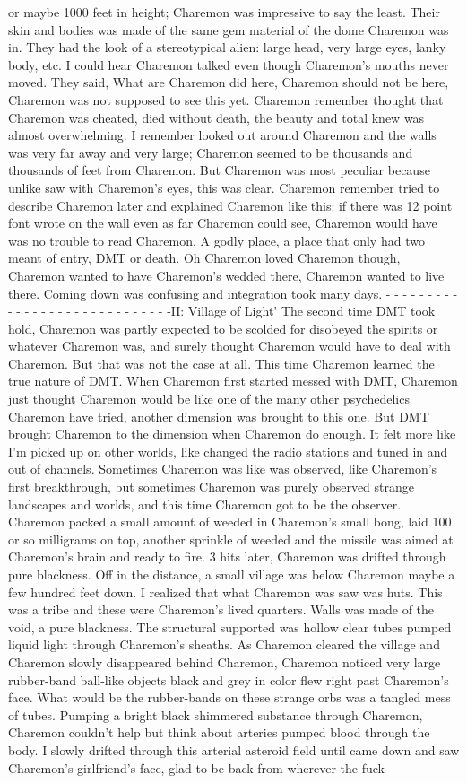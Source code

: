 \documentclass[12pt]{book}
\begin{document}
or maybe 1000 feet in height; Charemon was impressive to say the least. Their skin and bodies was made of the same gem material of the dome Charemon was in. They had the look of a stereotypical alien: large head, very large eyes, lanky body, etc. I could hear Charemon talked even though Charemon's mouths never moved. They said, What are Charemon did here, Charemon should not be here, Charemon was not supposed to see this yet.  Charemon remember thought that Charemon was cheated, died without death, the beauty and total knew was almost overwhelming. I remember looked out around Charemon and the walls was very far away and very large; Charemon seemed to be thousands and thousands of feet from Charemon. But Charemon was most peculiar because unlike saw with Charemon's eyes, this was clear. Charemon remember tried to describe Charemon later and explained Charemon like this: if there was 12 point font wrote on the wall even as far Charemon could see, Charemon would have was no trouble to read Charemon. A godly place, a place that only had two meant of entry, DMT or death. Oh Charemon loved Charemon though, Charemon wanted to have Charemon's wedded there, Charemon wanted to live there. Coming down was confusing and integration took many days. - - - - - - - - - - - - - - - - - - - - - - - - - - - - -II: Village of Light' The second time DMT took hold, Charemon was partly expected to be scolded for disobeyed the spirits or whatever Charemon was, and surely thought Charemon would have to deal with Charemon. But that was not the case at all. This time Charemon learned the true nature of DMT. When Charemon first started messed with DMT, Charemon just thought Charemon would be like one of the many other psychedelics Charemon have tried, another dimension was brought to this one. But DMT brought Charemon to the dimension when Charemon do enough. It felt more like I'm picked up on other worlds, like changed the radio stations and tuned in and out of channels. Sometimes Charemon was like was observed, like Charemon's first breakthrough, but sometimes Charemon was purely observed strange landscapes and worlds, and this time Charemon got to be the observer. Charemon packed a small amount of weeded in Charemon's small bong, laid 100 or so milligrams on top, another sprinkle of weeded and the missile was aimed at Charemon's brain and ready to fire. 3 hits later, Charemon was drifted through pure blackness. Off in the distance, a small village was below Charemon maybe a few hundred feet down. I realized that what Charemon was saw was huts. This was a tribe and these were Charemon's lived quarters. Walls was made of the void, a pure blackness. The structural supported was hollow clear tubes pumped liquid light through Charemon's sheaths. As Charemon cleared the village and Charemon slowly disappeared behind Charemon, Charemon noticed very large rubber-band ball-like objects black and grey in color flew right past Charemon's face. What would be the rubber-bands on these strange orbs was a tangled mess of tubes. Pumping a bright black shimmered substance through Charemon, Charemon couldn't help but think about arteries pumped blood through the body. I slowly drifted through this arterial asteroid field until came down and saw Charemon's girlfriend's face, glad to be back from wherever the fuck 
\end{document}

